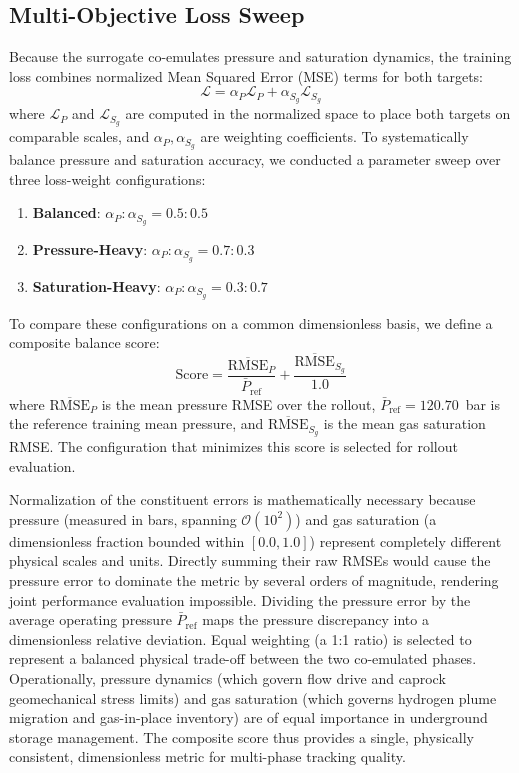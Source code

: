 \subsection{Multi-Objective Loss Sweep}
Because the surrogate co-emulates pressure and saturation dynamics, the training loss combines normalized Mean Squared Error (MSE) terms for both targets:
\begin{equation}
\label{eq:loss}
\mathcal{L} = \alpha_P \mathcal{L}_P + \alpha_{S_g} \mathcal{L}_{S_g}
\end{equation}
where $\mathcal{L}_P$ and $\mathcal{L}_{S_g}$ are computed in the normalized space to place both targets on comparable scales, and $\alpha_P, \alpha_{S_g}$ are weighting coefficients. To systematically balance pressure and saturation accuracy, we conducted a parameter sweep over three loss-weight configurations:
\begin{enumerate}
    \item \textbf{Balanced}: $\alpha_P : \alpha_{S_g} = 0.5 : 0.5$
    \item \textbf{Pressure-Heavy}: $\alpha_P : \alpha_{S_g} = 0.7 : 0.3$
    \item \textbf{Saturation-Heavy}: $\alpha_P : \alpha_{S_g} = 0.3 : 0.7$
\end{enumerate}

To compare these configurations on a common dimensionless basis, we define a composite balance score:
\begin{equation}
\label{eq:composite_score}
\text{Score} = \frac{\overline{\text{RMSE}}_P}{\bar{P}_{\text{ref}}} + \frac{\overline{\text{RMSE}}_{S_g}}{1.0}
\end{equation}
where $\overline{\text{RMSE}}_P$ is the mean pressure RMSE over the rollout, $\bar{P}_{\text{ref}} = 120.70$~bar is the reference training mean pressure, and $\overline{\text{RMSE}}_{S_g}$ is the mean gas saturation RMSE. The configuration that minimizes this score is selected for rollout evaluation.

Normalization of the constituent errors is mathematically necessary because pressure (measured in bars, spanning $\mathcal{O}(10^2)$) and gas saturation (a dimensionless fraction bounded within $[0.0, 1.0]$) represent completely different physical scales and units. Directly summing their raw RMSEs would cause the pressure error to dominate the metric by several orders of magnitude, rendering joint performance evaluation impossible. Dividing the pressure error by the average operating pressure $\bar{P}_{\text{ref}}$ maps the pressure discrepancy into a dimensionless relative deviation. Equal weighting (a 1:1 ratio) is selected to represent a balanced physical trade-off between the two co-emulated phases. Operationally, pressure dynamics (which govern flow drive and caprock geomechanical stress limits) and gas saturation (which governs hydrogen plume migration and gas-in-place inventory) are of equal importance in underground storage management. The composite score thus provides a single, physically consistent, dimensionless metric for multi-phase tracking quality.
